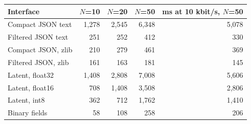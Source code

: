 \begin{tabular}{lrrrr}
\toprule
Interface & $N$=10 & $N$=20 & $N$=50 & ms at 10 kbit/s, $N$=50 \\
\midrule
Compact JSON text & 1,278 & 2,545 & 6,348 & 5,078 \\
Filtered JSON text & 251 & 252 & 412 & 330 \\
Compact JSON, zlib & 210 & 279 & 461 & 369 \\
Filtered JSON, zlib & 161 & 163 & 181 & 145 \\
Latent, float32 & 1,408 & 2,808 & 7,008 & 5,606 \\
Latent, float16 & 708 & 1,408 & 3,508 & 2,806 \\
Latent, int8 & 362 & 712 & 1,762 & 1,410 \\
Binary fields & 58 & 108 & 258 & 206 \\
\bottomrule
\end{tabular}
